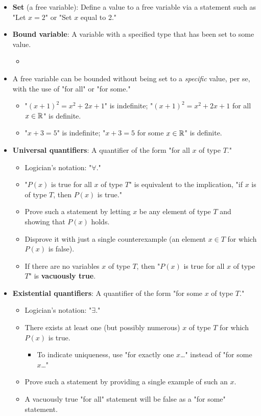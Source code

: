 \documentclass[../main.tex]{subfiles}
\begin{document}
\begin{itemize}
\begin{itemize}
    \end{itemize}
    \item \textbf{Set} (a free variable): Define a value to a free variable via a statement such as "Let $x=2$" or "Set $x$ equal to 2."
    \item \textbf{Bound variable}: A variable with a specified type that has been set to some value.
    \begin{itemize}
        \item {}
    \end{itemize}
    \item A free variable can be bounded without being set to a \emph{specific} value, per se, with the use of "for all" or "for some."
    \begin{itemize}
        \item "$(x+1)^2=x^2+2x+1$" is indefinite; "$(x+1)^2=x^2+2x+1$ for all $x\in\mathbb{R}$" is definite.
        \item "$x+3=5$" is indefinite; "$x+3=5$ for some $x\in\mathbb{R}$" is definite.
    \end{itemize}
    \item \textbf{Universal quantifiers}: A quantifier of the form "for all $x$ of type $T$."
    \begin{itemize}
        \item Logician's notation: "$\forall$."
        \item "$P(x)$ is true for all $x$ of type $T$" is equivalent to the implication, "if $x$ is of type $T$, then $P(x)$ is true."
        \item Prove such a statement by letting $x$ be any element of type $T$ and showing that $P(x)$ holds.
        \item Disprove it with just a single counterexample (an element $x\in T$ for which $P(x)$ is false).
        \item If there are no variables $x$ of type $T$, then "$P(x)$ is true for all $x$ of type $T$" is \textbf{vacuously true}.
    \end{itemize}
    \item \textbf{Existential quantifiers}: A quantifier of the form "for some $x$ of type $T$."
    \begin{itemize}
        \item Logician's notation: "$\exists$."
        \item There exists at least one (but possibly numerous) $x$ of type $T$ for which $P(x)$ is true.
        \begin{itemize}
            \item To indicate uniqueness, use "for exactly one $x$\dots" instead of "for some $x$\dots"
        \end{itemize}
        \item Prove such a statement by providing a single example of such an $x$.
        \item A vacuously true "for all" statement will be false as a "for some" statement.
    \end{itemize}
\end{itemize}
\end{document}
